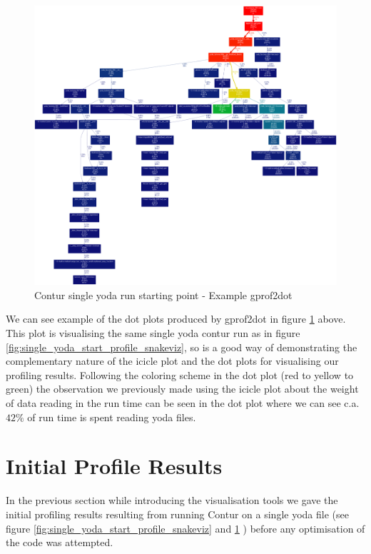 \begin{figure}[H]
\centering
\includegraphics[scale=0.2]{plots/initial_contur_single_yoda.png}
\caption{Contur single yoda run starting point - Example gprof2dot}
\label{fig:single_yoda_start_profile_gprof2dot}
\end{figure}

We can see example of the dot plots produced by gprof2dot in figure \ref{fig:single_yoda_start_profile_gprof2dot} above. This plot is visualising the same single yoda contur run as in figure \ref{fig:single_yoda_start_profile_snakeviz}, so is a good way of demonstrating the complementary nature of the icicle plot and the dot plots for visualising our profiling results. Following the coloring scheme in the dot plot (red to yellow to green) the observation we previously made using the icicle plot about the weight of data reading in the run time can be seen in the dot plot where we can see c.a. $42\%$ of run time is spent reading yoda files.

\section{Initial Profile Results}
In the previous section while introducing the visualisation tools we gave the initial profiling results resulting from running Contur on a single yoda file (see figure \ref{fig:single_yoda_start_profile_snakeviz} and \ref{fig:single_yoda_start_profile_gprof2dot} ) before any optimisation of the code was attempted. 

